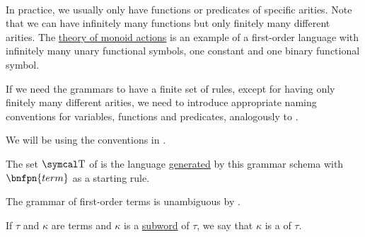 \begin{definition}
\begin{DefEnum}
\begin{bnf*}
      \bnfmore                  {\hspace{3cm} \vdots} \\
       \\
      \bnfmore                  {\hspace{3cm} \vdots} \\
               { \bnfor} \\
       \\
       \\
    \end{bnf*}

    In practice, we usually only have functions or predicates of specific arities. Note that we can have infinitely many functions but only finitely many different arities. The \hyperref[remark:theory_of_left_monoid_actions]{theory of monoid actions} is an example of a first-order language with infinitely many unary functional symbols, one constant and one binary functional symbol.

    If we need the grammars to have a finite set of rules, except for having only finitely many different arities, we need to introduce appropriate naming conventions for variables, functions and predicates, analogously to .

    We will be using the conventions in .

    The set \( \CT \) of  is the language \hyperref[def:grammar_derivation/grammar_language]{generated} by this grammar schema with \( \bnfpn{term} \) as a starting rule.

    The grammar of first-order terms is unambiguous by .

     If \( \tau \) and \( \kappa \) are terms and \( \kappa \) is a \hyperref[def:language/subword]{subword} of \( \tau \), we say that \( \kappa \) is a  of \( \tau \).


\end{DefEnum}
\end{definition}
